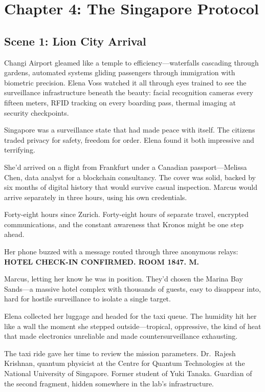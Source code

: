 \hypertarget{chapter-4-the-singapore-protocol}{%
\section{Chapter 4: The Singapore Protocol}\label{chapter-4-the-singapore-protocol}}

\hypertarget{scene-1-lion-city-arrival}{%
\subsection{Scene 1: Lion City Arrival}\label{scene-1-lion-city-arrival}}

Changi Airport gleamed like a temple to efficiency---waterfalls cascading through gardens, automated systems gliding passengers through immigration with biometric precision. Elena Voss watched it all through eyes trained to see the surveillance infrastructure beneath the beauty: facial recognition cameras every fifteen meters, RFID tracking on every boarding pass, thermal imaging at security checkpoints.

Singapore was a surveillance state that had made peace with itself. The citizens traded privacy for safety, freedom for order. Elena found it both impressive and terrifying.

She'd arrived on a flight from Frankfurt under a Canadian passport---Melissa Chen, data analyst for a blockchain consultancy. The cover was solid, backed by six months of digital history that would survive casual inspection. Marcus would arrive separately in three hours, using his own credentials.

Forty-eight hours since Zurich. Forty-eight hours of separate travel, encrypted communications, and the constant awareness that Kronos might be one step ahead.

Her phone buzzed with a message routed through three anonymous relays: \textbf{HOTEL CHECK-IN CONFIRMED. ROOM 1847. M.}

Marcus, letting her know he was in position. They'd chosen the Marina Bay Sands---a massive hotel complex with thousands of guests, easy to disappear into, hard for hostile surveillance to isolate a single target.

Elena collected her luggage and headed for the taxi queue. The humidity hit her like a wall the moment she stepped outside---tropical, oppressive, the kind of heat that made electronics unreliable and made countersurveillance exhausting.

The taxi ride gave her time to review the mission parameters. Dr.~Rajesh Krishnan, quantum physicist at the Centre for Quantum Technologies at the National University of Singapore. Former student of Yuki Tanaka. Guardian of the second fragment, hidden somewhere in the lab's infrastructure.

